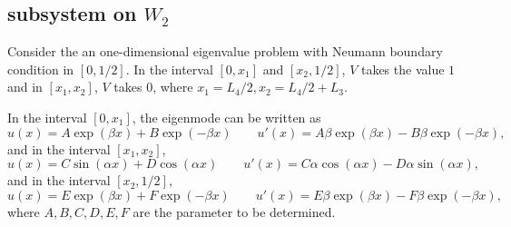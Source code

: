 \documentclass[a4paper,11pt]{article}
\begin{document}
\begin{appendices}
\subsection{subsystem on $W_2$}

Consider the an one-dimensional eigenvalue problem with Neumann boundary condition in $[0, 1/2]$. In the interval $[0, x_1]$ and $[x_2, 1/2]$, $V$ takes the value $1$ and in $[x_1, x_2]$, $V$ takes $0$, where $x_1 = L_4/2, x_2 = L_4/2 + L_3$.

In the interval $[0, x_1]$, the eigenmode can be written as
\begin{equation*}
u(x) = A \exp(\beta x) + B \exp(-\beta x) \qquad u'(x) = A \beta \exp(\beta x) - B \beta \exp(-\beta x),
\end{equation*}
and in the interval $[x_1, x_2]$,
\begin{equation*}
u(x) = C \sin(\alpha x) + D \cos(\alpha x) \qquad u'(x) = C \alpha \cos(\alpha x) - D \alpha \sin(\alpha x),
\end{equation*}
and in the interval $[x_2, 1/2]$,
\begin{equation*}
u(x) = E \exp(\beta x) + F \exp(-\beta x) \qquad u'(x) = E \beta \exp(\beta x) - F \beta \exp(-\beta x),
\end{equation*}
where $A ,B, C, D, E, F$ are the parameter to be determined.


\end{appendices}
\end{document}
